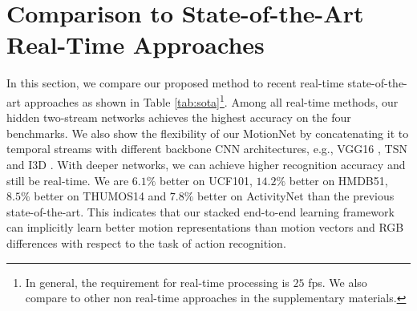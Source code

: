 \documentclass[runningheads]{llncs}
\begin{document}
		\section{Comparison to State-of-the-Art Real-Time Approaches}
		\label{sec:sota}
		In this section, we compare our proposed method to recent real-time state-of-the-art approaches as shown in Table \ref{tab:sota}\footnote{In general, the requirement for real-time processing is $25$ fps. We also compare to other non real-time approaches in the supplementary materials.}. Among all real-time methods, our hidden two-stream networks achieves the highest accuracy on the {\color{black}four} benchmarks. We also show the flexibility of our MotionNet by concatenating it to temporal streams with different backbone CNN architectures, e.g., VGG16 \cite{wanggoodpractice2015}, TSN \cite{TSN2016} and I3D \cite{I3D_Carreira_cvpr17}. With deeper networks, we can achieve higher recognition accuracy and still be real-time. We are $6.1\%$ better on UCF101, $14.2\%$ better on HMDB51, {\color{black} $8.5\%$ better on THUMOS14 and $7.8\%$ better on ActivityNet} than the previous state-of-the-art. This indicates that {\color{black} our stacked end-to-end learning framework can implicitly learn better motion representations than motion vectors \cite{kantorov2014,EMV_cvpr16} and RGB differences \cite{TSN2016} with respect to the task of action recognition.}
		
		








		
\end{document}
